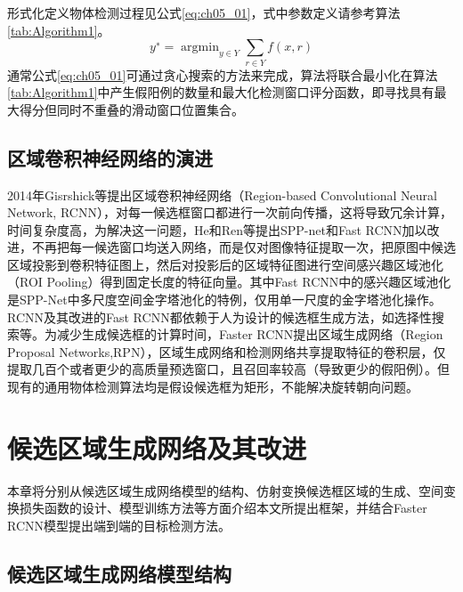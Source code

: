 形式化定义物体检测过程见公式\ref{eq:ch05_01}，式中参数定义请参考算法\ref{tab:Algorithm1}。
\begin{equation} \label{eq:ch05_01}
      y^∗=\mathop{\arg\min}_{y\in Y}\sum _{r\in Y} f(x,r)
\end{equation}                               	 
通常公式\ref{eq:ch05_01}可通过贪心搜索的方法来完成，算法将联合最小化在算法\ref{tab:Algorithm1}中产生假阳例的数量和最大化检测窗口评分函数，即寻找具有最大得分但同时不重叠的滑动窗口位置集合。
\subsection{区域卷积神经网络的演进}

2014年Gisrshick等\citep{Girshick2014b}提出区域卷积神经网络（Region-based Convolutional Neural Network, RCNN），对每一候选框窗口都进行一次前向传播，这将导致冗余计算，时间复杂度高，为解决这一问题，He和Ren等提出SPP-net\citep{He2015spp}和Fast RCNN\citep{Girshick2015b}加以改进，不再把每一候选窗口均送入网络，而是仅对图像特征提取一次，把原图中候选区域投影到卷积特征图上，然后对投影后的区域特征图进行空间感兴趣区域池化（ROI Pooling）得到固定长度的特征向量。其中Fast RCNN中的感兴趣区域池化是SPP-Net中多尺度空间金字塔池化的特例，仅用单一尺度的金字塔池化操作。RCNN及其改进的Fast RCNN都依赖于人为设计的候选框生成方法，如选择性搜索等。为减少生成候选框的计算时间，Faster RCNN提出区域生成网络（Region Proposal Networks,RPN），区域生成网络和检测网络共享提取特征的卷积层，仅提取几百个或者更少的高质量预选窗口，且召回率较高（导致更少的假阳例）。但现有的通用物体检测算法均是假设候选框为矩形，不能解决旋转朝向问题。

 
\section{候选区域生成网络及其改进}
 
本章将分别从候选区域生成网络模型的结构、仿射变换候选框区域的生成、空间变换损失函数的设计、模型训练方法等方面介绍本文所提出框架，并结合Faster RCNN模型提出端到端的目标检测方法。

\subsection{候选区域生成网络模型结构}

